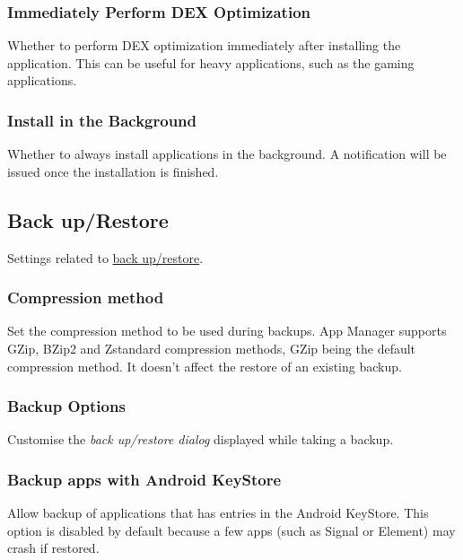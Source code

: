 \subsubsection{Immediately Perform DEX Optimization} %
Whether to perform DEX optimization immediately after installing the application. This can be useful
for heavy applications, such as the gaming applications.

\subsubsection{Install in the Background} %
Whether to always install applications in the background. A notification will be issued once the installation is finished.


\subsection{Back up/Restore}\label{subsec:backup/restore} %
Settings related to \hyperref[sec:backup-restore]{back up/restore}.

\subsubsection{Compression method} %
Set the compression method to be used during backups. App Manager supports GZip, BZip2 and Zstandard
compression methods, GZip being the default compression method. It doesn't affect the restore of
an existing backup.

\subsubsection{Backup Options}\label{subsubsec:settings-backup-options} %
Customise the \textit{back up/restore dialog} displayed while taking a backup.


\subsubsection{Backup apps with Android KeyStore} %
Allow backup of applications that has entries in the Android KeyStore. This option is disabled by
default because a few apps (such as Signal or Element) may crash if restored.

